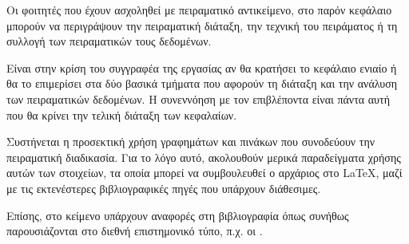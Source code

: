 Οι φοιτητές που έχουν ασχοληθεί με πειραματικό αντικείμενο, στο παρόν
κεφάλαιο μπορούν να περιγράψουν την πειραματική διάταξη, την τεχνική
του πειράματος ή τη συλλογή των πειραματικών τους δεδομένων.

Είναι στην κρίση του συγγραφέα της εργασίας αν θα κρατήσει το κεφάλαιο
ενιαίο ή θα το επιμερίσει στα δύο βασικά τμήματα που αφορούν τη
διάταξη και την ανάλυση των πειραματικών δεδομένων. Η συνεννόηση
με τον επιβλέποντα είναι πάντα αυτή που θα κρίνει την τελική διάταξη
των κεφαλαίων.

Συστήνεται η προσεκτική χρήση γραφημάτων και πινάκων που
συνοδεύουν την πειραματική διαδικασία. Για το λόγο αυτό, ακολουθούν
μερικά παραδείγματα χρήσης αυτών των στοιχείων, τα
οποία μπορεί να συμβουλευθεί ο αρχάριος στο \LaTeX, μαζί με
τις εκτενέστερες βιβλιογραφικές πηγές που υπάρχουν διάθεσιμες.

Επίσης, στο κείμενο υπάρχουν αναφορές στη βιβλιογραφία όπως συνήθως
παρουσιάζονται στο διεθνή επιστημονικό τύπο,
π.χ. οι \cite{2012_PM,2011_AIP_Cl44}. 